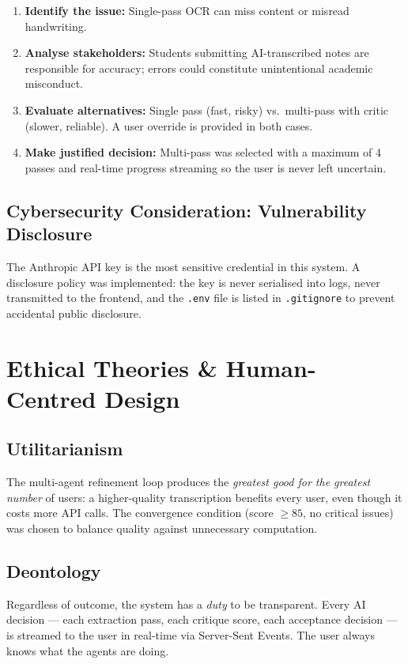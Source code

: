 \documentclass[12pt,a4paper]{article}
\begin{document}
\begin{enumerate}[noitemsep]
  \item \textbf{Identify the issue:} Single-pass OCR can miss content or misread handwriting.
  \item \textbf{Analyse stakeholders:} Students submitting AI-transcribed notes are responsible
    for accuracy; errors could constitute unintentional academic misconduct.
  \item \textbf{Evaluate alternatives:} Single pass (fast, risky) vs.\ multi-pass with critic
    (slower, reliable). A user override is provided in both cases.
  \item \textbf{Make justified decision:} Multi-pass was selected with a maximum of 4 passes and
    real-time progress streaming so the user is never left uncertain.
\end{enumerate}

\subsection{Cybersecurity Consideration: Vulnerability Disclosure}
The Anthropic API key is the most sensitive credential in this system. A disclosure policy was
implemented: the key is never serialised into logs, never transmitted to the frontend, and the
\texttt{.env} file is listed in \texttt{.gitignore} to prevent accidental public disclosure.


\section{Ethical Theories \& Human-Centred Design}

\subsection{Utilitarianism}
The multi-agent refinement loop produces the \emph{greatest good for the greatest number} of
users: a higher-quality transcription benefits every user, even though it costs more API calls.
The convergence condition (score $\geq 85$, no critical issues) was chosen to balance quality
against unnecessary computation.

\subsection{Deontology}
Regardless of outcome, the system has a \emph{duty} to be transparent. Every AI decision — each
extraction pass, each critique score, each acceptance decision — is streamed to the user in
real-time via Server-Sent Events. The user always knows what the agents are doing.
\end{document}
